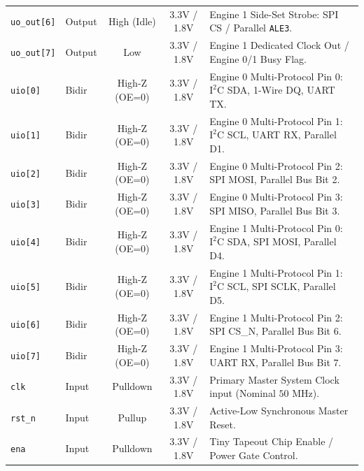 \documentclass[11pt,a4paper]{article}
\begin{document}
\begin{table}[htbp]
\begin{tabularx}{\textwidth}{llccX}
\texttt{uo\_out[6]} & Output & High (Idle)      & 3.3V / 1.8V & Engine 1 Side-Set Strobe: SPI CS / Parallel \texttt{ALE3}. \\
\texttt{uo\_out[7]} & Output & Low              & 3.3V / 1.8V & Engine 1 Dedicated Clock Out / Engine 0/1 Busy Flag. \\
\midrule
\texttt{uio[0]}    & Bidir  & High-Z (OE=0)    & 3.3V / 1.8V & Engine 0 Multi-Protocol Pin 0: $\text{I}^2\text{C}$ SDA, 1-Wire DQ, UART TX. \\
\texttt{uio[1]}    & Bidir  & High-Z (OE=0)    & 3.3V / 1.8V & Engine 0 Multi-Protocol Pin 1: $\text{I}^2\text{C}$ SCL, UART RX, Parallel D1. \\
\texttt{uio[2]}    & Bidir  & High-Z (OE=0)    & 3.3V / 1.8V & Engine 0 Multi-Protocol Pin 2: SPI MOSI, Parallel Bus Bit 2. \\
\texttt{uio[3]}    & Bidir  & High-Z (OE=0)    & 3.3V / 1.8V & Engine 0 Multi-Protocol Pin 3: SPI MISO, Parallel Bus Bit 3. \\
\texttt{uio[4]}    & Bidir  & High-Z (OE=0)    & 3.3V / 1.8V & Engine 1 Multi-Protocol Pin 0: $\text{I}^2\text{C}$ SDA, SPI MOSI, Parallel D4. \\
\texttt{uio[5]}    & Bidir  & High-Z (OE=0)    & 3.3V / 1.8V & Engine 1 Multi-Protocol Pin 1: $\text{I}^2\text{C}$ SCL, SPI SCLK, Parallel D5. \\
\texttt{uio[6]}    & Bidir  & High-Z (OE=0)    & 3.3V / 1.8V & Engine 1 Multi-Protocol Pin 2: SPI CS\_N, Parallel Bus Bit 6. \\
\texttt{uio[7]}    & Bidir  & High-Z (OE=0)    & 3.3V / 1.8V & Engine 1 Multi-Protocol Pin 3: UART RX, Parallel Bus Bit 7. \\
\midrule
\texttt{clk}       & Input  & Pulldown         & 3.3V / 1.8V & Primary Master System Clock input (Nominal $50\text{ MHz}$). \\
\texttt{rst\_n}     & Input  & Pullup           & 3.3V / 1.8V & Active-Low Synchronous Master Reset. \\
\texttt{ena}       & Input  & Pulldown         & 3.3V / 1.8V & Tiny Tapeout Chip Enable / Power Gate Control. \\
\bottomrule
\end{tabularx}
\end{table}
\end{document}
